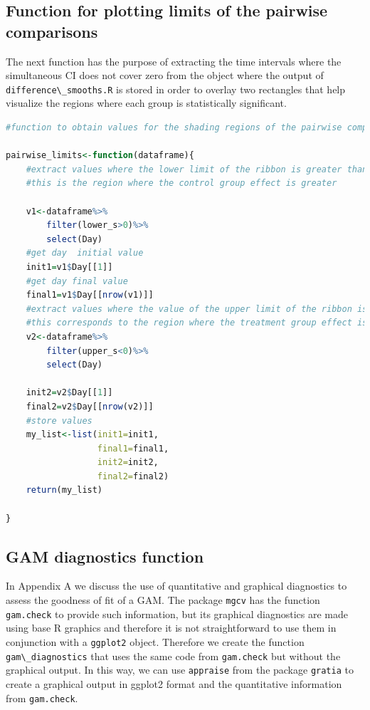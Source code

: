 \documentclass[
]{article}
\newcommand{\passthrough}[1]{#1}
\begin{document}
\hypertarget{function-for-plotting-limits-of-the-pairwise-comparisons}{%
\subsection{Function for plotting limits of the pairwise comparisons}\label{function-for-plotting-limits-of-the-pairwise-comparisons}}

The next function has the purpose of extracting the time intervals where the simultaneous CI does not cover zero from the object where the output of \passthrough{\lstinline!difference\_smooths.R!} is stored in order to overlay two rectangles that help visualize the regions where each group is statistically significant.

\begin{lstlisting}[language=R]
#function to obtain values for the shading regions of the pairwise comparison between the smooths

pairwise_limits<-function(dataframe){
    #extract values where the lower limit of the ribbon is greater than zero
    #this is the region where the control group effect is greater

    v1<-dataframe%>%
        filter(lower_s>0)%>%
        select(Day)
    #get day  initial value
    init1=v1$Day[[1]]
    #get day final value
    final1=v1$Day[[nrow(v1)]]
    #extract values where the value of the upper limit of the ribbon is lower than zero
    #this corresponds to the region where the treatment group effect is greater
    v2<-dataframe%>%
        filter(upper_s<0)%>%
        select(Day)

    init2=v2$Day[[1]]
    final2=v2$Day[[nrow(v2)]]
    #store values
    my_list<-list(init1=init1,
                  final1=final1,
                  init2=init2,
                  final2=final2)
    return(my_list)

}
\end{lstlisting}

\hypertarget{gam-diagnostics-function}{%
\subsection{GAM diagnostics function}\label{gam-diagnostics-function}}

In Appendix A we discuss the use of quantitative and graphical diagnostics to assess the goodness of fit of a GAM. The package \passthrough{\lstinline!mgcv!} has the function \passthrough{\lstinline!gam.check!} to provide such information, but its graphical diagnostics are made using base R graphics and therefore it is not straightforward to use them in conjunction with a \passthrough{\lstinline!ggplot2!} object. Therefore we create the function \passthrough{\lstinline!gam\_diagnostics!} that uses the same code from \passthrough{\lstinline!gam.check!} but without the graphical output. In this way, we can use \passthrough{\lstinline!appraise!} from the package \passthrough{\lstinline!gratia!} to create a graphical output in ggplot2 format and the quantitative information from \passthrough{\lstinline!gam.check!}.
\end{document}
